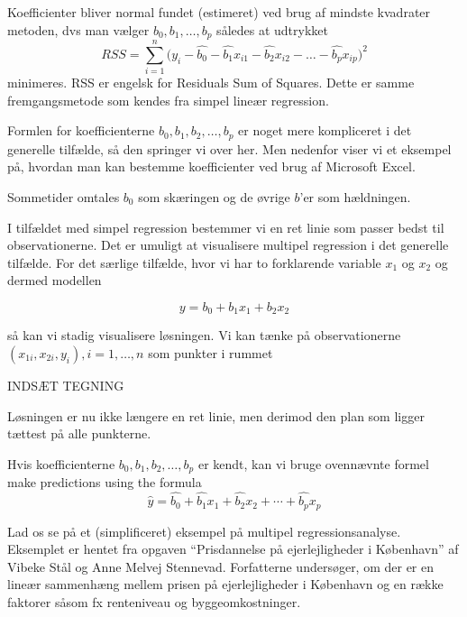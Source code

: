 Koefficienter bliver normal fundet (estimeret) ved brug af mindste kvadrater metoden, dvs man vælger \(b_0, b_1, \ldots , b_p\)  således at udtrykket
\begin{displaymath}
  RSS =\sum^n_{i=1} \big (y_i - \widehat{b_0} - \widehat{b_1} x_{i1} - \widehat{b_2} x_{i2} - \dots - \widehat{b_p} x_{ip} \big)^2
\end{displaymath}
minimeres. RSS er engelsk for Residuals Sum of Squares. Dette er samme fremgangsmetode som kendes fra simpel lineær regression.

Formlen for koefficienterne \(b_0,b_1,b_2,\ldots,b_p\) er noget mere kompliceret i det generelle tilfælde, så den springer vi over her. Men nedenfor viser vi et eksempel på, hvordan man kan bestemme koefficienter ved brug af Microsoft Excel.

Sommetider omtales \(b_0\) som skæringen og de øvrige \(b\)'er som hældningen.

I tilfældet med simpel regression bestemmer vi en ret linie som passer bedst til observationerne. Det er umuligt at visualisere multipel regression i det generelle tilfælde. For det særlige tilfælde, hvor vi har to forklarende variable \(x_1\) og \(x_2\) og dermed modellen

\begin{displaymath}
  y = b_0 + b_1 x_1 + b_2 x_2
\end{displaymath}

så kan vi stadig visualisere løsningen. Vi kan tænke på observationerne \((x_{1i}, x_{2i}, y_i), i=1,\ldots,n\) som punkter i rummet

INDSÆT TEGNING

Løsningen er nu ikke længere en ret linie, men derimod den plan som ligger tættest på alle punkterne.




Hvis koefficienterne \(b_0,b_1,b_2,\ldots,b_p\) er kendt, kan vi bruge ovennævnte formel
make predictions using the formula
\begin{displaymath}
\hat{y} = \hat{b_0} + \hat{b_1}x_1 + \hat{b_2}x_2 + \cdots + \hat{b_p}x_p
\end{displaymath}

Lad os se på et (simplificeret) eksempel på multipel regressionsanalyse. Eksemplet er hentet fra
opgaven ``Prisdannelse på ejerlejligheder i København'' af Vibeke Stål og Anne Melvej Stennevad.
Forfatterne undersøger, om der er en lineær sammenhæng mellem prisen på ejerlejligheder i København og en række faktorer såsom fx renteniveau og byggeomkostninger.

